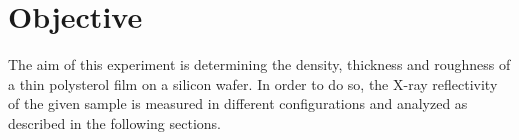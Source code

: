 \section{Objective}

The aim of this experiment is determining the density, thickness and roughness of a thin polysterol film on a silicon wafer.
In order to do so, the X-ray reflectivity of the given sample is measured in different configurations and analyzed as described
in the following sections.
